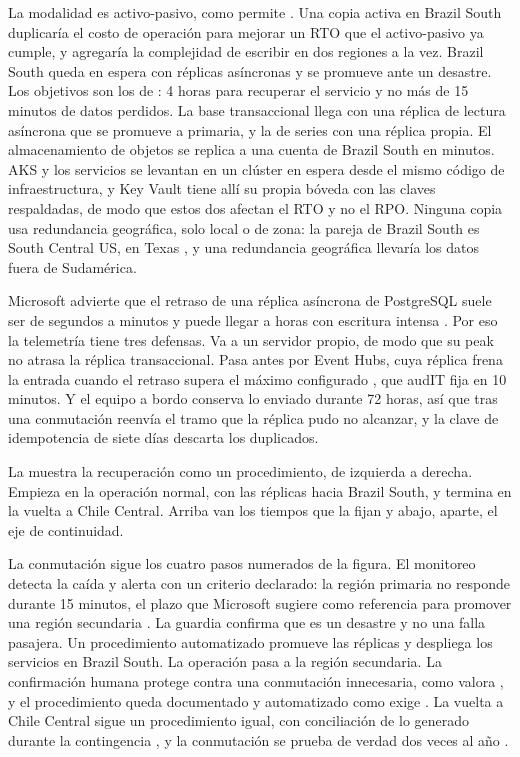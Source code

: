 La modalidad es activo-pasivo, como permite . Una copia activa en Brazil South
duplicaría el costo de operación para mejorar un RTO que el activo-pasivo ya cumple, y agregaría la
complejidad de escribir en dos regiones a la vez. Brazil South queda en espera con réplicas asíncronas y
se promueve ante un desastre. Los objetivos son los de : 4 horas para recuperar el
servicio y no más de 15 minutos de datos perdidos. La base transaccional llega con una réplica de lectura asíncrona que se
promueve a primaria, y la de series con una réplica propia. El almacenamiento de objetos se replica a
una cuenta de Brazil South en minutos. AKS y los servicios se levantan en un clúster en espera desde el
mismo código de infraestructura, y Key Vault tiene allí su propia bóveda con las claves respaldadas, de
modo que estos dos afectan el RTO y no el RPO. Ninguna copia usa redundancia geográfica, solo local o de
zona: la pareja de Brazil South es South Central US, en Texas \parencite{ms_regions}, y una redundancia
geográfica llevaría los datos fuera de Sudamérica.

Microsoft advierte que el retraso de una réplica asíncrona de PostgreSQL suele ser de segundos a minutos
y puede llegar a horas con escritura intensa \parencite{ms_pg_replicas}. Por eso la telemetría tiene tres
defensas. Va a un servidor propio, de modo que su peak no atrasa la réplica transaccional. Pasa antes por
Event Hubs, cuya réplica frena la entrada cuando el retraso supera el máximo configurado
\parencite{ms_eh_georep}, que audIT fija en 10 minutos. Y el equipo a bordo conserva lo enviado durante
72 horas, así que tras una conmutación reenvía el tramo que la réplica pudo no alcanzar, y la clave de
idempotencia de siete días descarta los duplicados.

La  muestra la recuperación como un procedimiento, de izquierda a derecha. Empieza en la
operación normal, con las réplicas hacia Brazil South, y termina en la vuelta a Chile Central. Arriba
van los tiempos que la fijan y abajo, aparte, el eje de continuidad.


La conmutación sigue los cuatro pasos numerados de la figura. El monitoreo detecta la caída y
alerta con un criterio declarado: la región primaria no responde durante 15 minutos, el plazo que
Microsoft sugiere como referencia para promover una región secundaria \parencite{ms_eh_georep}. La guardia
confirma que es un desastre y no una falla pasajera. Un procedimiento automatizado promueve las
réplicas y despliega los servicios en Brazil South. La operación pasa a la región secundaria. La
confirmación humana protege contra una conmutación innecesaria, como valora , y el
procedimiento queda documentado y automatizado como exige . La vuelta a Chile
Central sigue un procedimiento igual, con conciliación de lo generado durante la contingencia
, y la conmutación se prueba de verdad dos veces al año
.

